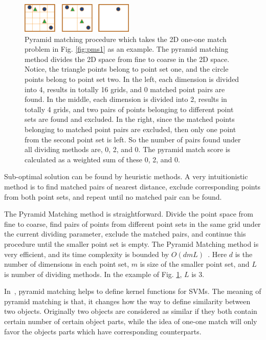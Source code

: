 \documentclass[paper]{ieice}
\begin{document}
\begin{figure}
\centering
\includegraphics[width=0.48\textwidth]{pms2.eps}
\caption[Pyramid matching procedure]{Pyramid matching procedure which takes the 2D one-one match problem in Fig. \ref{fig:pms1} as an example. The pyramid matching method divides the 2D space from fine to coarse in the 2D space. Notice, the triangle points belong to point set one, and the circle points belong to point set two. In the left, each dimension is divided into 4, results in totally 16 grids, and 0 matched point pairs are found. In the middle, each dimension is divided into 2, results in totally 4 grids, and two pairs of points belonging to different point sets are found and excluded. In the right, since the matched points belonging to matched point pairs are excluded, then only one point from the second point set is left. So the number of pairs found under all dividing methods are, 0, 2, and 0. The pyramid match score is calculated as a weighted sum of these 0, 2, and 0. }
\label{fig:p2}
\end{figure}




Sub-optimal solution can be found by heuristic methods. A very intuitionistic method is to find matched pairs of nearest distance, exclude corresponding points from both point sets, and repeat until no matched pair can be found.

The Pyramid Matching method is straightforward. Divide the point space from fine to coarse, find pairs of points from different point sets in the same grid under the current dividing parameter, exclude the matched pairs, and continue this procedure until the smaller point set is empty. The Pyramid Matching method is very efficient, and its time complexity is bounded by $O(dmL)$~\cite{pmk}. Here $d$ is the number of dimensions in each point set, $m$ is size of the smaller point set, and $L$ is number of dividing methods. In the example of Fig. \ref{fig:p2}, $L$ is 3.

In~\cite{pmk}, pyramid matching helps to define kernel functions for SVMs. The meaning of pyramid matching is that, it changes how the way to define similarity between two objects. Originally two objects are considered as similar if they both contain certain number of certain object parts, while the idea of one-one match will only favor the objects parts which have corresponding counterparts.
\end{document}
